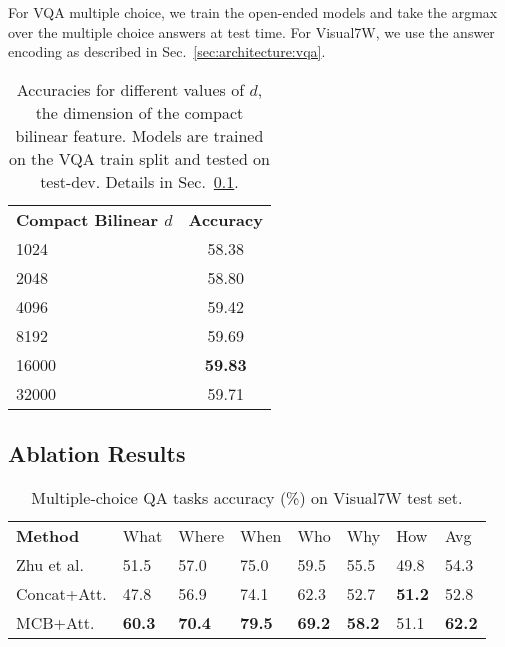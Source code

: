 \documentclass[11pt,letterpaper]{article}
\DeclareRobustCommand{\secref}[1]{Sec.~\ref{#1}}
\DeclareRobustCommand{\Secref}[1]{Sec.~\ref{#1}}
\newcommand{\twocmidrule}{\cmidrule(lr){1-1}\cmidrule(lr){2-2}}
\begin{document}
For VQA multiple choice, we train the open-ended models and take the argmax over the multiple choice answers at test time. For Visual7W, we use the answer encoding as described in \secref{sec:architecture:vqa}.

\begin{table}
\centering
\small
\begin{tabular}{lc}
\toprule
\bf Compact Bilinear $d$ & \bf Accuracy \\ 
\twocmidrule
1024 & 58.38 \\
2048 & 58.80 \\
4096 & 59.42 \\
8192 & 59.69 \\
16000 & \textbf{59.83} \\
32000 & 59.71 \\
\bottomrule
\end{tabular}
\caption{Accuracies for different values of $d$, the dimension of the compact bilinear feature. Models are trained on the VQA train split and tested on test-dev. Details in \Secref{sec:ablation}.}
\label{tab:comparedvalue}
\end{table}




\subsection{Ablation Results}
\label{sec:ablation}

\begin{table}[t]
\centering
\small
\begin{tabular}{@{}ll@{\ }l@{\ }l@{\ }l@{\ }l@{\ }l@{\ }l@{}}
\toprule
 \bf Method &  What &  Where &  When &  Who &  Why &  How & Avg \\ \cmidrule(lr){1-1}\cmidrule(lr){2-7}\cmidrule(lr){8-8}
Zhu et al. & 51.5 & 57.0 & 75.0 & 59.5 & 55.5 & 49.8 & 54.3 \\
 Concat+Att. & 47.8 & 56.9 & 74.1 & 62.3 & 52.7 & \bf 51.2 & 52.8 \\
 MCB+Att. & \bf 60.3 & \bf 70.4 & \bf 79.5 & \bf 69.2 & \bf 58.2 & 51.1 & \bf 62.2 \\
 \bottomrule
\end{tabular}
\caption{Multiple-choice QA tasks accuracy (\%) on Visual7W test set.}
\label{tab:Visual7W}
\end{table}
\end{document}
